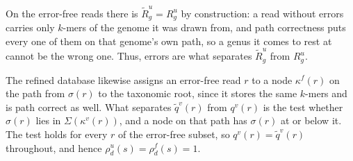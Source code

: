 \documentclass[pdflatex,sn-vancouver-num]{sn-jnl}
\begin{document}
    On the error-free reads there is $\widetilde{R}^u_g = R^u_g$ by construction: a read without errors carries only $k$-mers of the genome it was drawn from, and path correctness puts every one of them on that genome's own path, so a genus it comes to rest at cannot be the wrong one. Thus, errors are what separates $\widetilde{R}^u_g$ from $R^u_g$.

    The refined database likewise assigns an error-free read $r$ to a node $\kappa^f(r)$ on the path from $\sigma(r)$ to the taxonomic root, since it stores the same $k$-mers and is path correct as well. What separates $\tilde{q}^v(r)$ from $q^v(r)$ is the test whether $\sigma(r)$ lies in $\Sigma(\kappa^v(r))$, and a node on that path has $\sigma(r)$ at or below it. The test holds for every $r$ of the error-free subset, so $q^v(r) = \tilde{q}^v(r)$ throughout, and hence $\rho^u_d(s) = \rho^f_d(s) = 1$.
\end{document}
